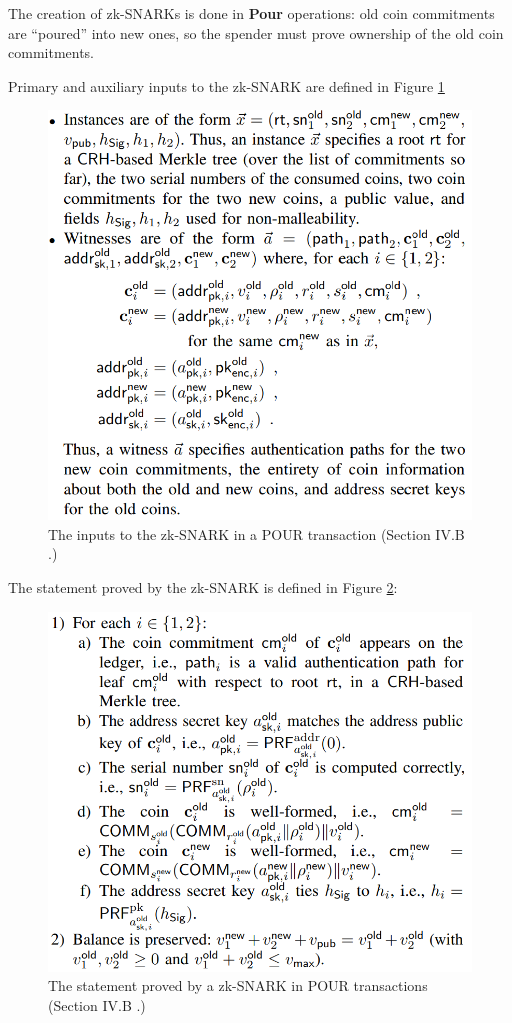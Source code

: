 \documentclass{article}
\begin{document}
The creation of zk-SNARKs is done in \textbf{Pour} operations:
old coin commitments are ``poured'' into new ones, so the spender must prove ownership of the old coin commitments.

Primary and auxiliary inputs to the zk-SNARK are defined in Figure \ref{fig:zerocash-inputs}

\begin{figure}[H]
\centering
\includegraphics[width=.7\textwidth]{zerocash-inputs.png}
\caption{The inputs to the zk-SNARK in a POUR transaction (Section IV.B \cite{bensasson:zerocash}.)} \label{fig:zerocash-inputs}
\centering
\end{figure}

The statement proved by the zk-SNARK is defined in Figure \ref{fig:zerocash-pour}:

\begin{figure}[H]
\centering
\includegraphics[width=.7\textwidth]{zerocash-pour.png}
\caption{The statement proved by a zk-SNARK in POUR transactions (Section IV.B \cite{bensasson:zerocash}.)} \label{fig:zerocash-pour}
\centering
\end{figure}
\end{document}
